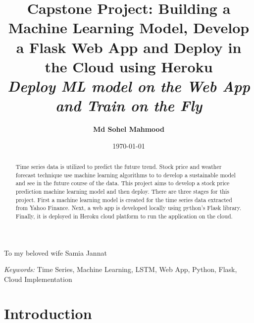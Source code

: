 \documentclass[11pt]{diazessay} %
\title{\textbf{Capstone Project: Building a Machine Learning Model, Develop a Flask Web App and Deploy in the Cloud using Heroku} \\ {\Large\itshape Deploy ML model on the Web App and Train on the Fly}} %
\author{\textbf{Md Sohel Mahmood} \\ \textit{}} %
\date{\today} %
\begin{document}
\maketitle %



\clearpage
\begin{center}
    \thispagestyle{empty}
    \vspace*{\fill}
    To my beloved wife Samia Jannat
    \vspace*{\fill}
\end{center}
\clearpage


\tableofcontents

\clearpage

\begin{abstract}
Time series data is utilized to predict the future trend. Stock price and weather forecast technique use machine learning algorithms to to develop a sustainable model and see in the future course of the data. This project aims to develop a stock price prediction machine learning model and then deploy. There are three stages for this project. First a machine learning model is created for the time series data extracted from Yahoo Finance. Next, a web app is developed locally using python's Flask library. Finally, it is deployed in Heroku cloud platform to run the application on the cloud.
\end{abstract}

\hspace*{3.6mm}\textit{Keywords:} Time Series, Machine Learning, LSTM, Web App, Python, Flask, Cloud Implementation %

\vspace{30pt} %




\section{Introduction}
\end{document}
